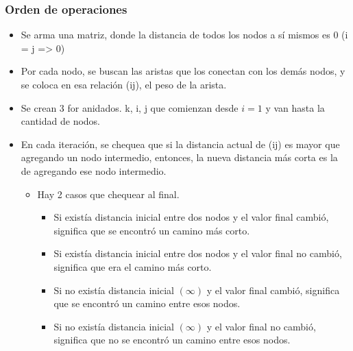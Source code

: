 \documentclass[10pt,a4paper]{article}
\begin{document}
\subsubsection*{Orden de operaciones}
\begin{itemize}
    \item Se arma una matriz, donde la distancia de todos los nodos a sí mismos es 0 (i = j => 0)
    \item Por cada nodo, se buscan las aristas que los conectan con los demás nodos, y se coloca en esa relación (ij), el peso de la arista.
    \item Se crean 3 for anidados. k, i, j que comienzan desde $i=1$ y van hasta la cantidad de nodos. 
    \item En cada iteración, se chequea que si la distancia actual de (ij) es mayor que agregando un nodo intermedio, entonces, la nueva distancia más corta es la de agregando ese nodo intermedio.
    \begin{itemize}
        \item Hay 2 casos que chequear al final.
        \begin{itemize}
            \item Si existía distancia inicial entre dos nodos y el valor final cambió, significa que se encontró un camino más corto.
            \item Si existía distancia inicial entre dos nodos y el valor final no cambió, significa que era el camino más corto.
            \item Si no existía distancia inicial $(\infty)$ y el valor final cambió, significa que se encontró un camino entre esos nodos.
            \item Si no existía distancia inicial $(\infty)$ y el valor final no cambió, significa que no se encontró un camino entre esos nodos.
        \end{itemize}
    \end{itemize}
\end{itemize}
\end{document}
